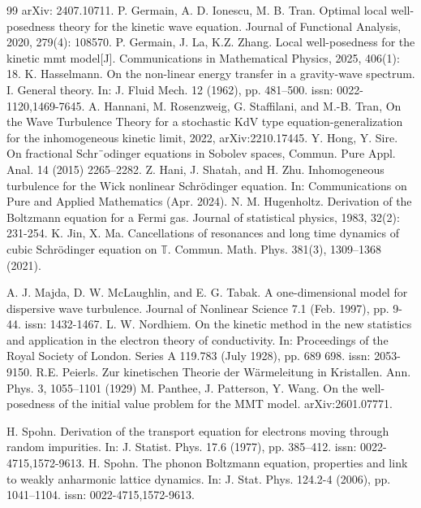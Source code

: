 \documentclass[UTF-8,reqno]{amsart}
\numberwithin{equation}{section}
\theoremstyle{definition}
\begin{document}
\begin{thebibliography}{99}
 arXiv: 2407.10711.
P. Germain, A. D. Ionescu, M. B. Tran. Optimal local well-posedness theory for the kinetic wave equation. Journal of Functional Analysis, 2020, 279(4): 108570.
P. Germain, J. La, K.Z. Zhang. Local well-posedness for the kinetic mmt model[J]. Communications in Mathematical Physics, 2025, 406(1): 18.
K. Hasselmann. On the non-linear energy transfer in a gravity-wave spectrum. I. General theory. In:
 J. Fluid Mech. 12 (1962), pp. 481–500. issn: 0022-1120,1469-7645.
  A. Hannani, M. Rosenzweig, G. Staffilani, and M.-B. Tran, On the Wave Turbulence Theory for a stochastic KdV
 type equation-generalization for the inhomogeneous kinetic limit, 2022, arXiv:2210.17445.
Y. Hong, Y. Sire. On fractional Schr¨odinger equations in Sobolev spaces, Commun. Pure Appl. Anal. 14
(2015) 2265–2282.
  Z. Hani, J. Shatah, and H. Zhu. Inhomogeneous turbulence for the Wick nonlinear Schr\"odinger
 equation. In: Communications on Pure and Applied Mathematics (Apr. 2024).
 N. M. Hugenholtz. Derivation of the Boltzmann equation for a Fermi gas. Journal of statistical physics, 1983, 32(2): 231-254.
 K. Jin, X. Ma. Cancellations of resonances and long time dynamics of cubic Schr\"odinger equation on $\mathbb{T}$. Commun. Math. Phys. 381(3), 1309–1368 (2021).
 
    A. J. Majda, D. W. McLaughlin, and E. G. Tabak. A one-dimensional model for dispersive wave
 turbulence. Journal of Nonlinear Science 7.1 (Feb. 1997), pp. 9-44. issn: 1432-1467. 
 L. W. Nordhiem. On the kinetic method in the new statistics and application in the electron theory of
 conductivity. In: Proceedings of the Royal Society of London. Series A 119.783 (July 1928), pp. 689
698. issn: 2053-9150.
 R.E. Peierls. Zur kinetischen Theorie der W\"armeleitung in Kristallen. Ann. Phys. 3, 1055–1101  (1929)
M. Panthee, J. Patterson, Y. Wang. 
On the well-posedness of the initial value problem for the MMT model. 
arXiv:2601.07771.
 
 H. Spohn. Derivation of the transport equation for electrons moving through random impurities.
 In: J. Statist. Phys. 17.6 (1977), pp. 385–412. issn: 0022-4715,1572-9613. 
 H. Spohn. The phonon Boltzmann equation, properties and link to weakly anharmonic lattice
 dynamics. In: J. Stat. Phys. 124.2-4 (2006), pp. 1041–1104. issn: 0022-4715,1572-9613. 


\end{thebibliography}
\end{document}
